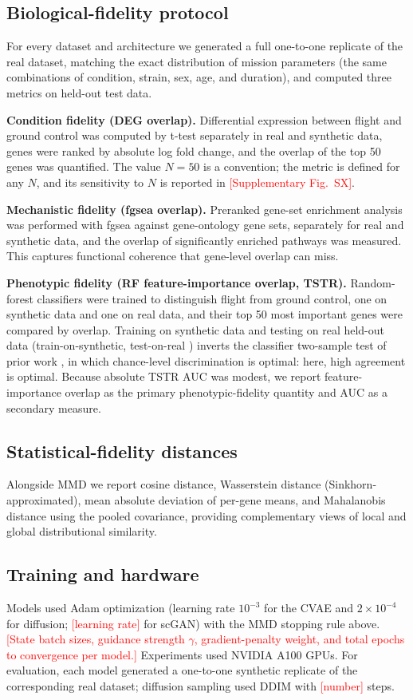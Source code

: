 \documentclass[11pt]{article}
\newcommand{\res}[1]{\textcolor{red}{[#1]}}
\begin{document}
\subsection{Biological-fidelity protocol}
For every dataset and architecture we generated a full one-to-one replicate of the real dataset, matching the exact distribution of mission parameters (the same combinations of condition, strain, sex, age, and duration), and computed three metrics on held-out test data.

\noindent\textbf{Condition fidelity (DEG overlap).} Differential expression between flight and ground control was computed by t-test separately in real and synthetic data, genes were ranked by absolute log fold change, and the overlap of the top 50 genes was quantified. The value $N=50$ is a convention; the metric is defined for any $N$, and its sensitivity to $N$ is reported in \res{Supplementary Fig.\ SX}.

\noindent\textbf{Mechanistic fidelity (fgsea overlap).} Preranked gene-set enrichment analysis was performed with fgsea \cite{fgsea} against gene-ontology gene sets, separately for real and synthetic data, and the overlap of significantly enriched pathways was measured. This captures functional coherence that gene-level overlap can miss.

\noindent\textbf{Phenotypic fidelity (RF feature-importance overlap, TSTR).} Random-forest classifiers were trained to distinguish flight from ground control, one on synthetic data and one on real data, and their top 50 most important genes were compared by overlap. Training on synthetic data and testing on real held-out data (train-on-synthetic, test-on-real \cite{esteban}) inverts the classifier two-sample test of prior work \cite{scgan,scdiffusion,lopezpaz}, in which chance-level discrimination is optimal: here, high agreement is optimal. Because absolute TSTR AUC was modest, we report feature-importance overlap as the primary phenotypic-fidelity quantity and AUC as a secondary measure.

\subsection{Statistical-fidelity distances}
Alongside MMD we report cosine distance, Wasserstein distance (Sinkhorn-approximated), mean absolute deviation of per-gene means, and Mahalanobis distance using the pooled covariance, providing complementary views of local and global distributional similarity.

\subsection{Training and hardware}
Models used Adam optimization (learning rate $10^{-3}$ for the CVAE and $2\times10^{-4}$ for diffusion; \res{learning rate} for scGAN) with the MMD stopping rule above. \res{State batch sizes, guidance strength $\gamma$, gradient-penalty weight, and total epochs to convergence per model.} Experiments used NVIDIA A100 GPUs. For evaluation, each model generated a one-to-one synthetic replicate of the corresponding real dataset; diffusion sampling used DDIM with \res{number} steps.
\end{document}
